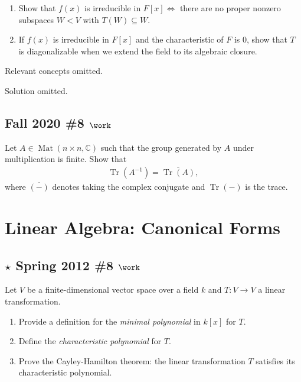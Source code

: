\begin{enumerate}
\def\labelenumi{\alph{enumi}.}
\item
  Show that \(f(x)\) is irreducible in \(F[x] \iff\) there are no proper
  nonzero subspaces \(W< V\) with \(T(W) \subseteq W\).
\item
  If \(f(x)\) is irreducible in \(F[x]\) and the characteristic of \(F\)
  is 0, show that \(T\) is diagonalizable when we extend the field to
  its algebraic closure.
\end{enumerate}


Relevant concepts omitted.

Solution omitted.

\hypertarget{fall-2020-8-work}{%
\subsection{\texorpdfstring{Fall 2020 \#8
\(\work\)}{Fall 2020 \#8 \textbackslash work}}\label{fall-2020-8-work}}

Let \(A\in \operatorname{Mat}(n\times n, {\mathbb{C}})\) such that the
group generated by \(A\) under multiplication is finite. Show that
\begin{align*}
\operatorname{Tr}(A^{-1}) ={\overline{{\operatorname{Tr}(A) }}}
,\end{align*}
where \({\overline{{({-})}}}\) denotes taking the complex conjugate and
\(\operatorname{Tr}({-})\) is the trace.

\hypertarget{linear-algebra-canonical-forms}{%
\section{Linear Algebra: Canonical
Forms}\label{linear-algebra-canonical-forms}}

\hypertarget{star-spring-2012-8-work}{%
\subsection{\texorpdfstring{\(\star\) Spring 2012 \#8
\(\work\)}{\textbackslash star Spring 2012 \#8 \textbackslash work}}\label{star-spring-2012-8-work}}

Let \(V\) be a finite-dimensional vector space over a field \(k\) and
\(T:V\to V\) a linear transformation.

\begin{enumerate}
\def\labelenumi{\alph{enumi}.}
\item
  Provide a definition for the \emph{minimal polynomial} in \(k[x]\) for
  \(T\).
\item
  Define the \emph{characteristic polynomial} for \(T\).
\item
  Prove the Cayley-Hamilton theorem: the linear transformation \(T\)
  satisfies its characteristic polynomial.
\end{enumerate}

